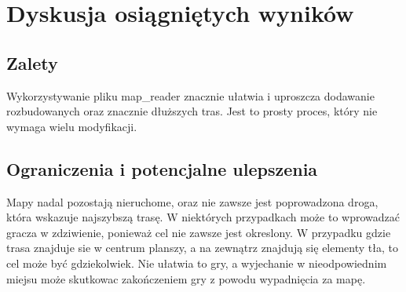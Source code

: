 \documentclass{article}
\begin{document}
\section{Dyskusja osiągniętych wyników}
\subsection{Zalety}
Wykorzystywanie pliku map\_reader znacznie ułatwia i uproszcza dodawanie rozbudowanych oraz znacznie dłuższych tras.
Jest to prosty proces, który nie wymaga wielu modyfikacji.

\subsection{Ograniczenia i potencjalne ulepszenia}
Mapy nadal pozostają nieruchome, oraz nie zawsze jest poprowadzona droga, która wskazuje najszybszą trasę. W niektórych przypadkach może to wprowadzać gracza w zdziwienie, ponieważ cel nie zawsze jest okreslony. W przypadku gdzie trasa znajduje sie w centrum planszy, a na zewnątrz znajdują się elementy tła, to cel może być gdziekolwiek.
Nie ułatwia to gry, a wyjechanie w nieodpowiednim miejsu może skutkowac zakończeniem gry z powodu wypadnięcia za mapę.
\end{document}

